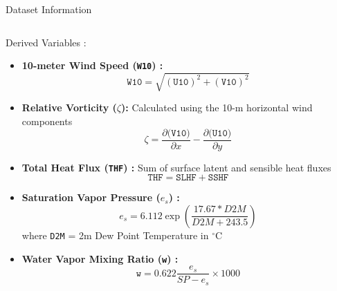 \begin{frame}{Dataset Information}
\begin{columns}[T, totalwidth=0.9\textwidth]
		\begin{block}{Derived Variables :}
			\begin{itemize}\footnotesize
				\item \textbf{10-meter Wind Speed (\texttt{W10}) :}
				      \footnotesize
				      \begin{equation}
					      \texttt{W10} = \sqrt{(\texttt{U10})^2 + (\texttt{V10})^2}
				      \end{equation}
				\item \textbf{Relative Vorticity (\texttt{$\zeta$}):} Calculated using the 10-m horizontal wind components
				      \footnotesize
				      \begin{equation}
					      \zeta = \frac{\partial(\texttt{V10)}}{\partial x} - \frac{\partial(\texttt{U10)}}{\partial y}
				      \end{equation}
				\item \textbf{Total Heat Flux (\texttt{THF}) :} Sum of surface latent and sensible heat fluxes
				      \footnotesize
				      \begin{equation}
					      \texttt{THF} = \texttt{SLHF} + \texttt{SSHF}
				      \end{equation}
				\item \textbf{Saturation Vapor Pressure (\texttt{$e_s$}) :}
				      \footnotesize
				      \begin{equation}
					      e_s = 6.112 \exp\left(\frac{17.67 * D2M}{D2M + 243.5}\right)
				      \end{equation}
				      where \texttt{D2M} = 2m Dew Point Temperature in $^\circ$C
				\item \textbf{Water Vapor Mixing Ratio (\texttt{w}) :}
				      \footnotesize
				      \begin{equation}
					      \texttt{w} = 0.622 \frac{e_s}{SP - e_s} \times 1000
				      \end{equation}
			\end{itemize}
		\end{block}
	\end{columns}
\end{frame}

